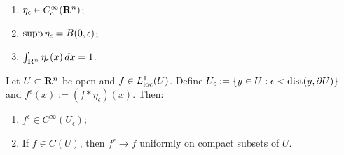 \begin{proposition}
	\mbox{}
	\begin{enumerate}[label = (\alph*),itemsep=1pt,topsep=3pt]
		\item $\eta_\epsilon \in C_c^\infty(\mathbf{R}^n)$;
		\item $\operatorname{supp} \eta_\epsilon = B(0,\epsilon)$;
		\item $\int_{\mathbf{R}^n}^{} \eta_\epsilon(x)\,dx = 1$.
	\end{enumerate}
\end{proposition}

\begin{theorem}
	Let $U \subset \mathbf{R}^n$ be open and $f \in L_{\operatorname{loc}}^1(U)$. Define $U_\epsilon := \{y \in U : \epsilon <  \operatorname{dist}(y,\partial U)\}$ and $f^{\epsilon}(x) := (f \ast \eta_\epsilon)(x)$. Then:
	\mbox{}
	\begin{enumerate}[label = (\alph*),itemsep=1pt,topsep=3pt]
		\item $f^\epsilon \in C^\infty(U_\epsilon)$;
		\item If $f \in C(U)$, then $f^\epsilon \rightarrow f$ uniformly on compact subsets of $U$.
	\end{enumerate}
\end{theorem}



